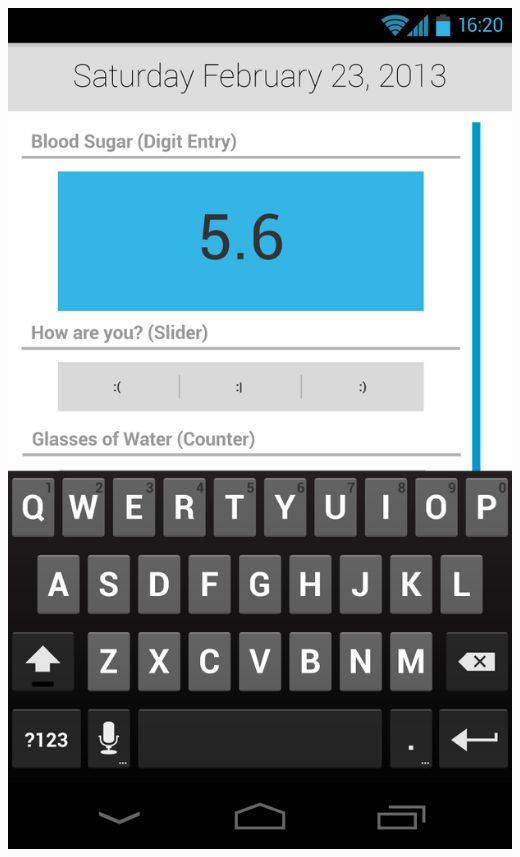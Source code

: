 \documentclass[pdftex,12pt,a4paper]{report}
\begin{document}
\begin{center}
	\includegraphics[scale=0.18]{Screens/03-Add--Add-Entry.png}
	

\end{center}
\end{document}
